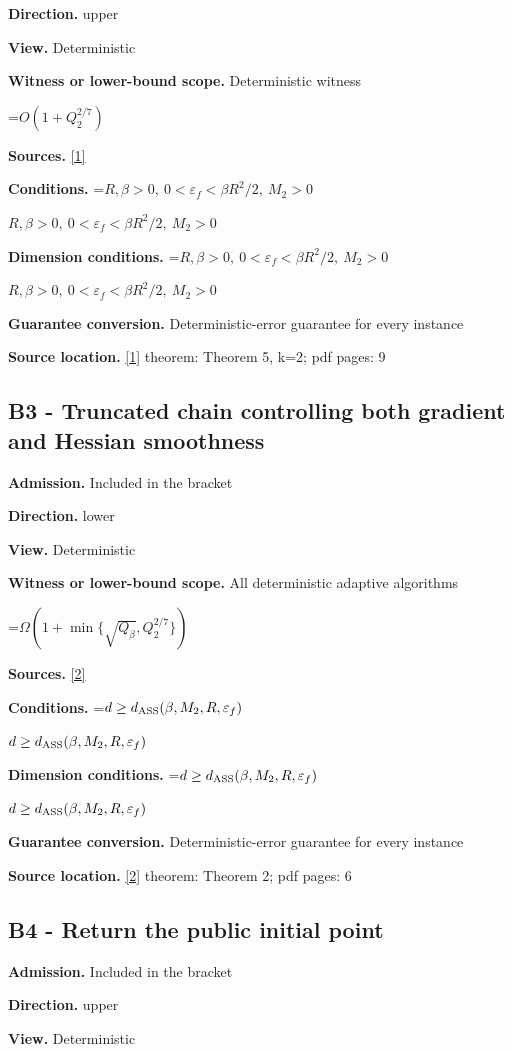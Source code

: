 \documentclass[10pt,a4paper]{article}
\newcommand{\AtlasMath}[1]{\par\begingroup\centering\setbox0=\hbox{$\displaystyle #1$}\ifdim\wd0>1.4\linewidth\typeout{ATLAS WIDE FORMULA: \the\wd0}\fi\ifdim\wd0>\linewidth\resizebox{\linewidth}{!}{\box0}\else\box0\fi\par\endgroup}
\newcommand{\AtlasInlineMath}[1]{\begingroup\setbox0=\hbox{$#1$}\ifdim\wd0>.4\linewidth\endgroup\AtlasMath{#1}\else\endgroup$#1$\fi}
\begin{document}
\textbf{Direction.} upper

\textbf{View.} Deterministic

\textbf{Witness or lower-bound scope.} Deterministic witness

\AtlasMath{O(1+Q_2^{2/7})}
\textbf{Sources.} \href{https://arxiv.org/pdf/2205.09647v1}{[1]}

\textbf{Conditions.} \AtlasInlineMath{R,\beta>0,\ 0<\varepsilon_f<\beta R^2/2,\ M_2>0}

\textbf{Dimension conditions.} \AtlasInlineMath{R,\beta>0,\ 0<\varepsilon_f<\beta R^2/2,\ M_2>0}

\textbf{Guarantee conversion.} Deterministic-error guarantee for every instance

\textbf{Source location.} \href{https://arxiv.org/pdf/2205.09647v1}{[1]} theorem: Theorem 5, k=2; pdf pages: 9

\subsection{B3 - Truncated chain controlling both gradient and Hessian smoothness}
\textbf{Admission.} Included in the bracket

\textbf{Direction.} lower

\textbf{View.} Deterministic

\textbf{Witness or lower-bound scope.} All deterministic adaptive algorithms

\AtlasMath{\Omega(1+\min\{\sqrt{Q_\beta},Q_2^{2/7}\})}
\textbf{Sources.} \href{https://arxiv.org/pdf/1705.07260v2}{[2]}

\textbf{Conditions.} \AtlasInlineMath{d\ge d_{\rm ASS}(\beta,M_2,R,\varepsilon_f)}

\textbf{Dimension conditions.} \AtlasInlineMath{d\ge d_{\rm ASS}(\beta,M_2,R,\varepsilon_f)}

\textbf{Guarantee conversion.} Deterministic-error guarantee for every instance

\textbf{Source location.} \href{https://arxiv.org/pdf/1705.07260v2}{[2]} theorem: Theorem 2; pdf pages: 6

\subsection{B4 - Return the public initial point}
\textbf{Admission.} Included in the bracket

\textbf{Direction.} upper

\textbf{View.} Deterministic
\end{document}
